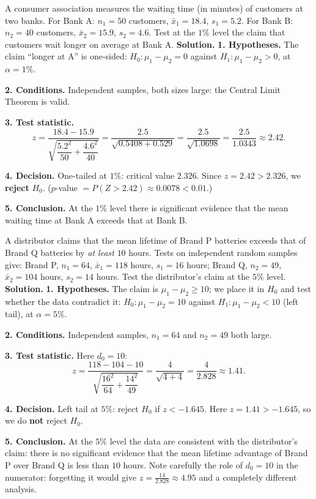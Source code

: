 \documentclass[11pt]{article}
\begin{document}
\begin{exoresolu}
A consumer association measures the waiting time (in minutes) of customers at two banks. For Bank A: $n_1=50$ customers, $\bar{x}_1=18.4$, $s_1=5.2$. For Bank B: $n_2=40$ customers, $\bar{x}_2=15.9$, $s_2=4.6$. Test at the $1\%$ level the claim that customers wait longer on average at Bank A.
\tcblower
\textbf{Solution.}
\textbf{1. Hypotheses.} The claim ``longer at A'' is one-sided: $H_0:\mu_1-\mu_2=0$ against $H_1:\mu_1-\mu_2>0$, at $\alpha=1\%$.

\textbf{2. Conditions.} Independent samples, both sizes large: the Central Limit Theorem is valid.

\textbf{3. Test statistic.}
\[ z=\frac{18.4-15.9}{\sqrt{\dfrac{5.2^2}{50}+\dfrac{4.6^2}{40}}}
=\frac{2.5}{\sqrt{0.5408+0.529}}
=\frac{2.5}{\sqrt{1.0698}}
=\frac{2.5}{1.0343}\approx 2.42. \]

\textbf{4. Decision.} One-tailed at $1\%$: critical value $2.326$. Since $z=2.42>2.326$, we \textbf{reject} $H_0$. ($p$-value $=P(Z>2.42)\approx 0.0078<0.01$.)

\textbf{5. Conclusion.} At the $1\%$ level there is significant evidence that the mean waiting time at Bank A exceeds that at Bank B.
\end{exoresolu}

\begin{exoresolu}
A distributor claims that the mean lifetime of Brand P batteries exceeds that of Brand Q batteries by \emph{at least} $10$ hours. Tests on independent random samples give: Brand P, $n_1=64$, $\bar{x}_1=118$ hours, $s_1=16$ hours; Brand Q, $n_2=49$, $\bar{x}_2=104$ hours, $s_2=14$ hours. Test the distributor's claim at the $5\%$ level.
\tcblower
\textbf{Solution.}
\textbf{1. Hypotheses.} The claim is $\mu_1-\mu_2\geq 10$; we place it in $H_0$ and test whether the data contradict it: $H_0:\mu_1-\mu_2=10$ against $H_1:\mu_1-\mu_2<10$ (left tail), at $\alpha=5\%$.

\textbf{2. Conditions.} Independent samples, $n_1=64$ and $n_2=49$ both large.

\textbf{3. Test statistic.} Here $d_0=10$:
\[ z=\frac{118-104-10}{\sqrt{\dfrac{16^2}{64}+\dfrac{14^2}{49}}}
=\frac{4}{\sqrt{4+4}}
=\frac{4}{2.828}\approx 1.41. \]

\textbf{4. Decision.} Left tail at $5\%$: reject $H_0$ if $z<-1.645$. Here $z=1.41>-1.645$, so we do \textbf{not} reject $H_0$.

\textbf{5. Conclusion.} At the $5\%$ level the data are consistent with the distributor's claim: there is no significant evidence that the mean lifetime advantage of Brand P over Brand Q is less than $10$ hours. Note carefully the role of $d_0=10$ in the numerator: forgetting it would give $z=\frac{14}{2.828}\approx 4.95$ and a completely different analysis.
\end{exoresolu}
\end{document}
